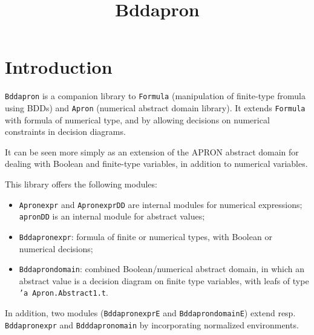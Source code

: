 \documentclass[twoside,10pt,a4paper]{report}
\title{Bddapron}
\begin{document}
\maketitle

\tableofcontents

\chapter{Introduction}

\texttt{Bddapron} is a companion library to \texttt{Formula}
(manipulation of finite-type fromula using BDDs) and
\texttt{Apron} (numerical abstract domain library). It extends
\texttt{Formula} with formula of numerical type, and by allowing
decisions on numerical constraints in decision diagrams.

It can be seen more simply as an extension of the APRON abstract domain for
dealing with Boolean and finite-type variables, in addition to numerical
variables.

This library offers the following modules:
\begin{itemize}
\item \texttt{Apronexpr} and \texttt{ApronexprDD} are internal
  modules for numerical expressions; \texttt{apronDD} is an
  internal module for abstract values;
\item \texttt{Bddapronexpr}: formula of finite or numerical types,
  with Boolean or numerical decisions;
\item \texttt{Bddaprondomain}: combined Boolean/numerical abstract
  domain, in which an abstract value is a decision diagram on
  finite type variables, with leafs of type \texttt{'a
    Apron.Abstract1.t}.
\end{itemize}
In addition, two modules (\texttt{BddapronexprE} and
\texttt{BddaprondomainE}) extend resp. \texttt{Bddapronexpr} and
\texttt{Bdddapronomain} by incorporating normalized environments.


\end{document}
